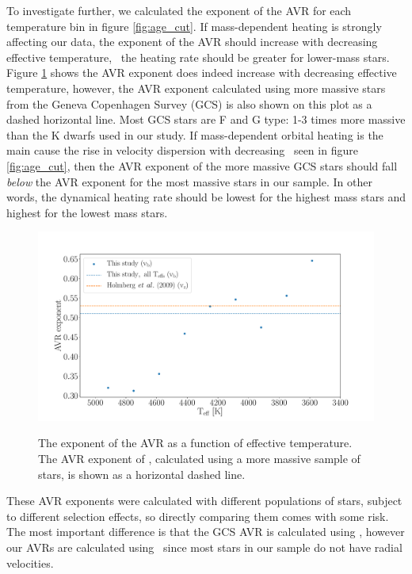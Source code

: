 To investigate further, we calculated the exponent of the AVR for each
temperature bin in figure \ref{fig:age_cut}.
If mass-dependent heating is strongly affecting our data, the exponent of the
AVR should increase with decreasing effective temperature, \ie\ the heating
rate should be greater for lower-mass stars.
Figure \ref{fig:AVR_exponent} shows the AVR exponent does indeed increase with
decreasing effective temperature, however, the AVR exponent calculated using
more massive stars from the Geneva Copenhagen Survey (GCS)
\citep{holmberg2009} is also shown on this plot as a dashed horizontal line.
Most GCS stars are F and G type: 1-3 times more massive than the K dwarfs used
in our study.
If mass-dependent orbital heating is the main cause the rise in velocity
dispersion with decreasing \teff\ seen in figure \ref{fig:age_cut}, then the
AVR exponent of the more massive GCS stars should fall {\it below} the AVR
exponent for the most massive stars in our sample.
In other words, the dynamical heating rate should be lowest for the highest
mass stars and highest for the lowest mass stars.
\begin{figure}
  \caption{
The exponent of the AVR as a function of effective temperature.
    The AVR exponent of \citet{holmberg2009}, calculated using a more massive
    sample of stars, is shown as a horizontal dashed line.
}
  \centering
    \includegraphics[width=1\textwidth]{AVR_exponent}
\label{fig:AVR_exponent}
\end{figure}
These AVR exponents were calculated with different populations of stars,
subject to different selection effects, so directly comparing them comes with
some risk.
The most important difference is that the GCS AVR is calculated using \vz,
however our AVRs are calculated using \vb\ since most stars in our sample do
not have radial velocities.
